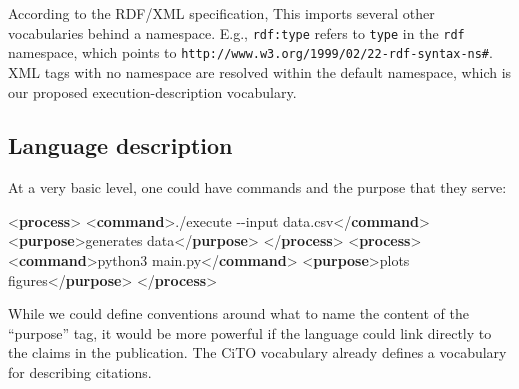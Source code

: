 \documentclass[manuscript,authordraft]{acmart}
\newenvironment{Shaded}{}{}
\newcommand{\KeywordTok}[1]{\textcolor[rgb]{0.00,0.44,0.13}{\textbf{#1}}}
\newcommand{\NormalTok}[1]{#1}
\begin{document}
\normalsize

According to the RDF/XML specification, This imports several other
vocabularies behind a namespace. E.g., \texttt{rdf:type} refers to
\texttt{type} in the \texttt{rdf} namespace, which points to
\texttt{http://www.w3.org/1999/02/22-rdf-syntax-ns\#}. XML tags with no
namespace are resolved within the default namespace, which is our
proposed execution-description vocabulary.

\hypertarget{language-description}{%
\subsection{Language description}\label{language-description}}

At a very basic level, one could have commands and the purpose that they
serve:

\small

\begin{Shaded}
\begin{Highlighting}[]

\NormalTok{\textless{}}\KeywordTok{process}\NormalTok{\textgreater{}}
\NormalTok{  \textless{}}\KeywordTok{command}\NormalTok{\textgreater{}./execute {-}{-}input data.csv\textless{}/}\KeywordTok{command}\NormalTok{\textgreater{}}
\NormalTok{  \textless{}}\KeywordTok{purpose}\NormalTok{\textgreater{}generates data\textless{}/}\KeywordTok{purpose}\NormalTok{\textgreater{}}
\NormalTok{\textless{}/}\KeywordTok{process}\NormalTok{\textgreater{}}
\NormalTok{\textless{}}\KeywordTok{process}\NormalTok{\textgreater{}}
\NormalTok{  \textless{}}\KeywordTok{command}\NormalTok{\textgreater{}python3 main.py\textless{}/}\KeywordTok{command}\NormalTok{\textgreater{}}
\NormalTok{  \textless{}}\KeywordTok{purpose}\NormalTok{\textgreater{}plots figures\textless{}/}\KeywordTok{purpose}\NormalTok{\textgreater{}}
\NormalTok{\textless{}/}\KeywordTok{process}\NormalTok{\textgreater{}}
\end{Highlighting}
\end{Shaded}

\normalsize

While we could define conventions around what to name the content of the
``purpose'' tag, it would be more powerful if the language could link
directly to the claims in the publication. The CiTO vocabulary
\cite{shotton_cito_2010} already defines a vocabulary for describing
citations.

\small
\end{document}
